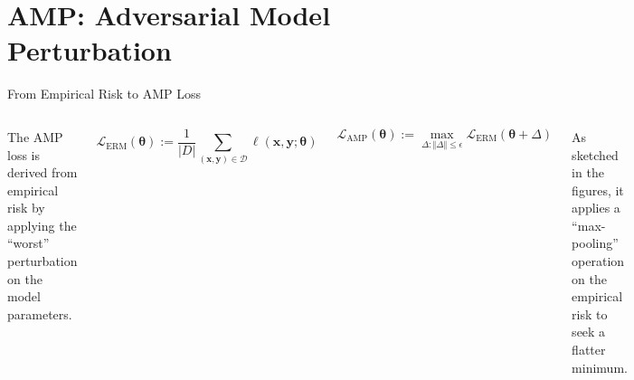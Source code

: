 \section{AMP: Adversarial Model Perturbation}


\begin{frame}{From Empirical Risk to AMP Loss}

\begin{columns}

The AMP loss is derived from empirical risk by applying the ``worst'' perturbation on the model parameters.

\begin{equation}
\mathcal{L}_\mathrm{ERM}(\boldsymbol{\theta}):=\frac{1}{|D|}\sum_{(\boldsymbol{x},\boldsymbol{y})\in\mathcal{D}}\ell(\boldsymbol{x},\boldsymbol{y};\boldsymbol{\theta})
\end{equation}

\begin{equation}
\mathcal{L}_\mathrm{AMP}(\boldsymbol{\theta}):=\max_{\Delta:\Vert\Delta\Vert\le\epsilon}\mathcal{L}_\mathrm{ERM}(\boldsymbol{\theta}+\Delta)
\end{equation}

As sketched in the figures, it applies a ``max-pooling'' operation on the empirical risk to seek a flatter minimum.

\begin{figure}
\includegraphics[width=.8\textwidth]{figs/loss_example_a.pdf}
\end{figure}


\end{columns}
\end{frame}
